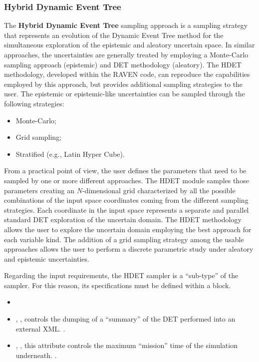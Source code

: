 \subsubsection{Hybrid Dynamic Event Tree}
\label{subsubsubsec:HDET}
The \textbf{Hybrid Dynamic Event Tree} sampling approach is a sampling strategy
that represents an evolution of the Dynamic Event Tree method for the
simultaneous exploration of the epistemic and aleatory uncertain space.
%
In similar approaches, the uncertainties are generally treated by employing a
Monte-Carlo sampling approach (epistemic) and DET methodology (aleatory).
%
The HDET methodology, developed within the RAVEN code, can reproduce the
capabilities employed by this approach, but provides additional sampling
strategies to the user.
%
The epistemic or epistemic-like uncertainties can be sampled through the
following strategies:

\begin{itemize}
  \item Monte-Carlo;
  \item Grid sampling;
  \item Stratified (e.g., Latin Hyper Cube).
\end{itemize}

From a practical point of view, the user defines the parameters that need to be
sampled by one or more different approaches.
%
The HDET module samples those parameters creating an $N$-dimensional grid
characterized by all the possible combinations of the input space coordinates
coming from the different sampling strategies.
%
Each coordinate in the input space represents a separate and parallel standard
DET exploration of the uncertain domain.
%
The HDET methodology allows the user to explore the uncertain domain
employing the best approach for each variable kind.
%
The addition of a grid sampling strategy among the usable approaches allows the
user to perform a discrete parametric study under aleatory and epistemic
uncertainties.

Regarding the input requirements, the HDET sampler is a ``sub-type'' of the\\
 sampler.
%
For this reason, its specifications must be defined within a
 block.
%
\attrsIntro

\begin{itemize}
  \itemsep0em
  \item \nameDescription
  \item {}, ,
    controls the dumping of a ``summary'' of the DET performed into an external
    XML.
    .
  \item {}, , this
    attribute controls the maximum ``mission'' time of the simulation
    underneath.
    .
\end{itemize}

